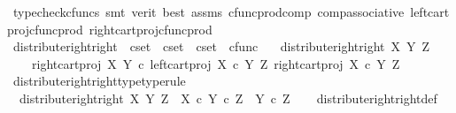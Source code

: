 \begin{isabellebody}
\ {\isacharparenleft}{\kern0pt}typecheck{\isacharunderscore}{\kern0pt}cfuncs{\isacharcomma}{\kern0pt}\ smt\ {\isacharparenleft}{\kern0pt}verit{\isacharcomma}{\kern0pt}\ best{\isacharparenright}{\kern0pt}\ assms\ cfunc{\isacharunderscore}{\kern0pt}prod{\isacharunderscore}{\kern0pt}comp\ comp{\isacharunderscore}{\kern0pt}associative{}\ left{\isacharunderscore}{\kern0pt}cart{\isacharunderscore}{\kern0pt}proj{\isacharunderscore}{\kern0pt}cfunc{\isacharunderscore}{\kern0pt}prod\ right{\isacharunderscore}{\kern0pt}cart{\isacharunderscore}{\kern0pt}proj{\isacharunderscore}{\kern0pt}cfunc{\isacharunderscore}{\kern0pt}prod{\isacharparenright}{\kern0pt}%
\endisatagproof
{\isafoldproof}%
%
\isadelimproof
\isanewline
%
\endisadelimproof
\isanewline
{}\isamarkupfalse%
\ distribute{\isacharunderscore}{\kern0pt}right{\isacharunderscore}{\kern0pt}right\ {\isacharcolon}{\kern0pt}{\isacharcolon}{\kern0pt}\ {\isachardoublequoteopen}cset\ {\isasymRightarrow}\ cset\ {\isasymRightarrow}\ cset\ {\isasymRightarrow}\ cfunc{\isachardoublequoteclose}\ \isanewline
\ \ {\isachardoublequoteopen}distribute{\isacharunderscore}{\kern0pt}right{\isacharunderscore}{\kern0pt}right\ X\ Y\ Z\ {\isacharequal}{\kern0pt}\ \isanewline
\ \ \ \ {\isasymlangle}right{\isacharunderscore}{\kern0pt}cart{\isacharunderscore}{\kern0pt}proj\ X\ Y\ {\isasymcirc}\isactrlsub c\ left{\isacharunderscore}{\kern0pt}cart{\isacharunderscore}{\kern0pt}proj\ {\isacharparenleft}{\kern0pt}X\ {\isasymtimes}\isactrlsub c\ Y{\isacharparenright}{\kern0pt}\ Z{\isacharcomma}{\kern0pt}\ right{\isacharunderscore}{\kern0pt}cart{\isacharunderscore}{\kern0pt}proj\ {\isacharparenleft}{\kern0pt}X\ {\isasymtimes}\isactrlsub c\ Y{\isacharparenright}{\kern0pt}\ Z{\isasymrangle}{\isachardoublequoteclose}\isanewline
\isanewline
{}\isamarkupfalse%
\ distribute{\isacharunderscore}{\kern0pt}right{\isacharunderscore}{\kern0pt}right{\isacharunderscore}{\kern0pt}type{\isacharbrackleft}{\kern0pt}type{\isacharunderscore}{\kern0pt}rule{\isacharbrackright}{\kern0pt}{\isacharcolon}{\kern0pt}\isanewline
\ \ {\isachardoublequoteopen}distribute{\isacharunderscore}{\kern0pt}right{\isacharunderscore}{\kern0pt}right\ X\ Y\ Z\ {\isacharcolon}{\kern0pt}\ {\isacharparenleft}{\kern0pt}X\ {\isasymtimes}\isactrlsub c\ Y{\isacharparenright}{\kern0pt}\ {\isasymtimes}\isactrlsub c\ Z\ {\isasymrightarrow}\ Y\ {\isasymtimes}\isactrlsub c\ Z{\isachardoublequoteclose}\isanewline
%
\isadelimproof
\ \ %
\endisadelimproof
%
\isatagproof
{}\isamarkupfalse%
\ distribute{\isacharunderscore}{\kern0pt}right{\isacharunderscore}{\kern0pt}right{\isacharunderscore}{\kern0pt}def\isanewline

\end{isabellebody}
